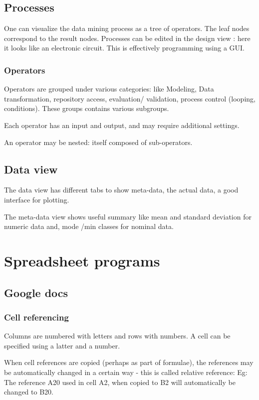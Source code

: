 \section{Processes}
One can visualize the data mining process as a tree of operators. The leaf nodes correspond to the result nodes. Processes can be edited in the design view : here it looks like an electronic circuit. This is effectively programming using a GUI.

\subsection{Operators}
Operators are grouped under various categories: like Modeling, Data transformation, repository access, evaluation/ validation, process control (looping, conditions). These groups contains various subgroups.

Each operator has an input and output, and may require additional settings.

An operator may be nested: itself composed of sub-operators.

\section{Data view}
The data view has different tabs to show meta-data, the actual data, a good interface for plotting.

The meta-data view shows useful summary like mean and standard deviation for numeric data and, mode /min classes for nominal data.

\chapter{Spreadsheet programs}
\section{Google docs}
\subsection{Cell referencing}
Columns are numbered with letters and rows with numbers. A cell can be specified using a latter and a number.

When cell references are copied (perhaps as part of formulae), the references may be automatically changed in a certain way - this is called relative reference: Eg: The reference A20 used in cell A2, when copied to B2 will automatically be changed to B20.

